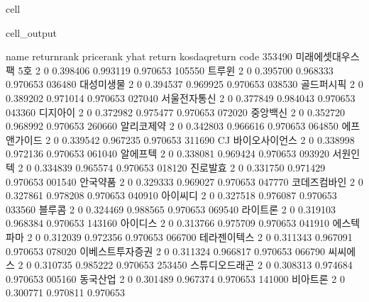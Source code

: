\documentclass[letterpaper,10pt,english]{jupyterBook}
\begin{document}
\begin{sphinxuseclass}{cell}
\begin{sphinxVerbatimOutput}
\begin{sphinxuseclass}{cell_output}
\begin{sphinxVerbatim}[commandchars=\\\{\}]
               name return\PYGZus{}rank price\PYGZus{}rank      yhat    return  kosdaq\PYGZus{}return  \PYGZbs{}
code                                                                            
353490  미래에셋대우스팩 5호           2          0  0.398406  0.993119       0.970653   
105550          트루윈           2          0  0.395700  0.968333       0.970653   
036480        대성미생물           2          0  0.394537  0.969925       0.970653   
038530        골드퍼시픽           2          0  0.389202  0.971014       0.970653   
027040       서울전자통신           2          0  0.377849  0.984043       0.970653   
043360         디지아이           2          0  0.372982  0.975477       0.970653   
072020         중앙백신           2          0  0.352720  0.968992       0.970653   
260660        알리코제약           2          0  0.342803  0.966616       0.970653   
064850       에프앤가이드           2          0  0.339542  0.967235       0.970653   
311690   CJ 바이오사이언스           2          0  0.338998  0.972136       0.970653   
061040         알에프텍           2          0  0.338081  0.969424       0.970653   
093920         서원인텍           2          0  0.334839  0.965574       0.970653   
018120         진로발효           2          0  0.331750  0.971429       0.970653   
001540         안국약품           2          0  0.329333  0.969027       0.970653   
047770       코데즈컴바인           2          0  0.327861  0.978208       0.970653   
040910         아이씨디           2          0  0.327518  0.976087       0.970653   
033560          블루콤           2          0  0.324469  0.988565       0.970653   
069540         라이트론           2          0  0.319103  0.968384       0.970653   
143160         아이디스           2          0  0.313766  0.975709       0.970653   
041910        에스텍파마           2          0  0.312039  0.972356       0.970653   
066700       테라젠이텍스           2          0  0.311343  0.967091       0.970653   
078020     이베스트투자증권           2          0  0.311324  0.966817       0.970653   
066790         씨씨에스           2          0  0.310735  0.985222       0.970653   
253450      스튜디오드래곤           2          0  0.308313  0.974684       0.970653   
005160         동국산업           2          0  0.301489  0.967374       0.970653   
141000         비아트론           2          0  0.300771  0.970811       0.970653   


\end{sphinxVerbatim}
\end{sphinxuseclass}
\end{sphinxVerbatimOutput}
\end{sphinxuseclass}
\end{document}
